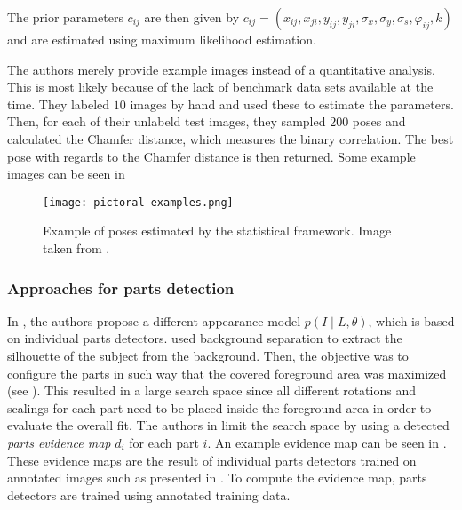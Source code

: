 The prior parameters $c_{ij}$ are then given by $c_{ij} = (x_{ij}, x_{ji}, y_{ij}, y_{ji}, \sigma_x, \sigma_y, \sigma_s, \varphi_{ij}, k)$ and are estimated using maximum likelihood estimation.

The authors merely provide example images instead of a quantitative analysis.
This is most likely because of the lack of benchmark data sets available at the time.
They labeled $10$ images by hand and used these to estimate the parameters.
Then, for each of their unlabeld test images, they sampled $200$ poses and calculated the Chamfer distance, which measures the binary correlation.
The best pose with regards to the Chamfer distance is then returned.
Some example images can be seen in 

\begin{figure}[htb!]
    \centering
    \texttt{[image: pictoral-examples.png]}
    \caption{Example of poses estimated by the statistical framework. Image taken from \cite{felzenszwalb_pictorial_2005}.}
    \label{fig:pictoral-examples}
\end{figure}

\subsubsection{Approaches for parts detection}


In \cite{andriluka_pictorial_2009}, the authors propose a different appearance model $p(I \mid L, \theta)$, which is based on individual parts detectors.
\cite{felzenszwalb_pictorial_2005} used background separation to extract the silhouette of the subject from the background.
Then, the objective was to configure the parts in such way that the covered foreground area was maximized (see ).
This resulted in a large search space since all different rotations and scalings for each part need to be placed inside the foreground area in order to evaluate the overall fit.
The authors in \cite{andriluka_pictorial_2009} limit the search space by using a detected \textit{parts evidence map} $d_i$ for each part $i$.
An example evidence map can be seen in .
These evidence maps are the result of individual parts detectors trained on annotated images such as presented in .
To compute the evidence map, parts detectors are trained using annotated training data.


